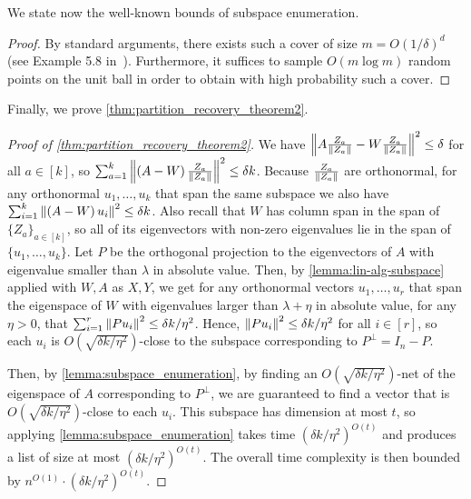 We state now the well-known bounds of subspace enumeration.


\begin{proof}
    By standard arguments, there exists such a cover of size $m = O(1/\delta)^d$ (see Example 5.8 in~\cite{MR3967104-Wainwright19}).
    Furthermore, it suffices to sample $O(m \log m)$ random points on the unit ball in order to obtain with high probability such a cover.
\end{proof}

Finally, we prove \cref{thm:partition_recovery_theorem2}.

\begin{proof}[Proof of \cref{thm:partition_recovery_theorem2}]
    We have $\left\lVert A \frac{Z_a}{\left\lVert Z_a\right\rVert} - W \frac{Z_a}{\left\lVert Z_a\right\rVert}\right\rVert^2 \leq \delta$ for all $a \in [k]$, so $\sum_{a=1}^k \left\lVert\left(A - W\right)\frac{Z_a}{\left\lVert Z_a\right\rVert}\right\rVert^2 \leq \delta k$.
    Because $\frac{Z_a}{\left\lVert Z_a\right\rVert}$ are orthonormal, for any orthonormal $u_1, \ldots, u_k$ that span the same subspace we also have $\sum_{i=1}^k \left\lVert\left(A -W\right)u_i\right\rVert^2
    \leq \delta k$.
    Also recall that $W$ has column span in the span of $\{Z_a\}_{a \in [k]}$, so all of its eigenvectors with non-zero eigenvalues lie in the span of $\{u_1, \ldots, u_k\}$.
    Let $P$ be the orthogonal projection to the eigenvectors of $A$ with eigenvalue smaller than $\lambda$ in absolute value.
    Then, by \cref{lemma:lin-alg-subspace} applied with $W, A$ as $X, Y$, we get for any orthonormal vectors $u_1, \ldots, u_r$ that span the eigenspace of $W$ with eigenvalues larger than $\lambda+\eta$ in absolute value, for any $\eta >0$, that $\sum_{i=1}^r \left\lVert P u_i\right\rVert^2 \leq \delta k / \eta^2$.
    Hence, $\left\lVert P u_i\right\rVert^2 \leq \delta k / \eta^2$ for all $i \in [r]$, so each $u_i$ is $O(\sqrt{\delta k / \eta^2})$-close to the subspace corresponding to $P^{\bot} = I_n - P$.

    Then, by \cref{lemma:subspace_enumeration}, by finding an $O(\sqrt{\delta k / \eta^2})$-net of the eigenspace of $A$ corresponding to $P^\bot$, we are guaranteed to find a vector that is $O(\sqrt{\delta k / \eta^2})$-close to each $u_i$.
    This subspace has dimension at most $t$, so applying \cref{lemma:subspace_enumeration} takes time $(\delta k/\eta^2)^{O(t)}$ and produces a list of size at most $(\delta k /\eta^2)^{O(t)}$.
    The overall time complexity is then bounded by $n^{O(1)} \cdot (\delta k/\eta^2)^{O(t)}$.
\end{proof}


